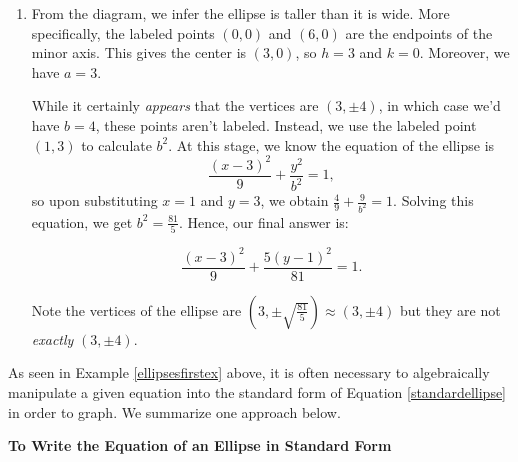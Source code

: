 \documentclass{ximera}
\begin{document}
\begin{example}
\begin{enumerate}
\begin{enumerate}
Since the center is the midpoint of the foci, we know the center of the ellipse is  $(3, 1)$ which means  $h = 3$ and $k = 1$. Since one vertex is at $(0,1)$, which is $3$ units from the center,  we have that $a = 3$, so $a^2 =  9$.   At this point, all that remains is to find $b^2$. 

Since the foci, $(2,1)$ and $(4,1)$,  are $1$ unit away from the center, we have $c=1$.  Putting this together with the fact that  $a > b$, we get $c = \sqrt{a^2-b^2}$, or $1 = \sqrt{9-b^2}$.  Squaring both sides gives $1 = 9-b^2$ or   $b^2 = 8$.  Feeding all of this data into Equation \ref{standardellipse}, we get our final answer:  \[\frac{(x-3)^2}{9}+\frac{(y-1)^2}{8}=1.\]

\item From the diagram, we infer the ellipse is taller than it is wide.  More specifically, the labeled points $(0,0)$ and $(6,0)$ are the endpoints of the minor axis.  This gives the center is $(3,0)$, so $h = 3$ and $k = 0$.  Moreover, we have $a = 3$.  

While it certainly \textit{appears} that the vertices are $(3, \pm 4)$, in which case we'd have $b = 4$, these points aren't labeled.  Instead, we use the labeled point $(1,3)$ to calculate $b^2$.  At this stage, we know the equation of the ellipse is \[ \frac{(x-3)^2}{9} + \frac{y^2}{b^2} = 1,\] so upon substituting $x=1$ and $y=3$, we obtain $\frac{4}{9} + \frac{9}{b^2} = 1$.  Solving this equation, we get $b^2 = \frac{81}{5}$.  Hence, our final answer is:

 \[\frac{(x-3)^2}{9}+\frac{5(y-1)^2}{81}=1.\]

Note the vertices of the ellipse are $\left(3, \pm \sqrt{\frac{81}{5}} \right) \approx (3, \pm 4)$ but they are not \textit{exactly} $(3, \pm 4)$.  

\end{enumerate}

\end{enumerate}
 
\end{example}

As seen in Example \ref{ellipsesfirstex} above, it is often necessary to algebraically manipulate a given equation into the standard form of Equation \ref{standardellipse} in order to graph.  We summarize one approach below.

 


\centerline{\textbf{To Write the Equation of an Ellipse in Standard Form}}
\end{document}
